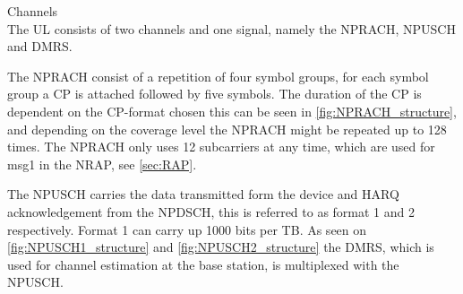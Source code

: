 Channels\\
The \gls{UL} consists of two channels and one signal, namely the \gls{NPRACH}, \gls{NPUSCH} and \gls{DMRS}.

The \gls{NPRACH} consist of a repetition of four symbol groups, for each symbol group a \gls{CP} is attached followed by five symbols. The duration of the CP is dependent on the CP-format chosen this can be seen in \autoref{fig:NPRACH_structure}, and depending on the coverage level the \gls{NPRACH} might be repeated up to 128 times. The NPRACH only uses 12 subcarriers at any time, which are used for msg1 in the \gls{NRAP}, see \autoref{sec:RAP}. \citep{NB-IoT_Book}

The \gls{NPUSCH} carries the data transmitted form the device and \gls{HARQ} acknowledgement from the \gls{NPDSCH}, this is referred to as format 1 and 2 respectively. Format 1 can carry up 1000 bits per \gls{TB}. As seen on \autoref{fig:NPUSCH1_structure} and \autoref{fig:NPUSCH2_structure} the DMRS, which is used for channel estimation at the base station, is multiplexed with the NPUSCH. 



